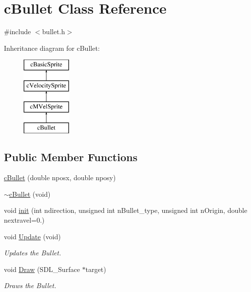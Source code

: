 \hypertarget{classc_bullet}{\section{c\-Bullet Class Reference}
\label{classc_bullet}
}


{\ttfamily \#include $<$bullet.\-h$>$}

Inheritance diagram for c\-Bullet\-:\begin{figure}[H]
\begin{center}
\leavevmode
\includegraphics[height=4.000000cm]{classc_bullet}
\end{center}
\end{figure}
\subsection*{Public Member Functions}
\begin{DoxyCompactItemize}
\item 
\hyperlink{classc_bullet_ac9a68c49e99fabe3a4352dbddf858310}{c\-Bullet} (double nposx, double nposy)
\item 
\hyperlink{classc_bullet_a52bc3566539019a6a58a8b0979fd0e22}{$\sim$c\-Bullet} (void)
\item 
void \hyperlink{classc_bullet_ae583bcd0a15e4f214be6160e9c621bb5}{init} (int ndirection, unsigned int n\-Bullet\-\_\-type, unsigned int n\-Origin, double nextravel=0.)
\item 
void \hyperlink{classc_bullet_a19e5203aca92a91dbb4ebf64a15c28f1}{Update} (void)
\begin{DoxyCompactList}\small\item\em Updates the Bullet. \end{DoxyCompactList}\item 
void \hyperlink{classc_bullet_a66a1f11209137959b2455a10efed94f4}{Draw} (S\-D\-L\-\_\-\-Surface $\ast$target)
\begin{DoxyCompactList}\small\item\em Draws the Bullet. \end{DoxyCompactList}\end{DoxyCompactItemize}
